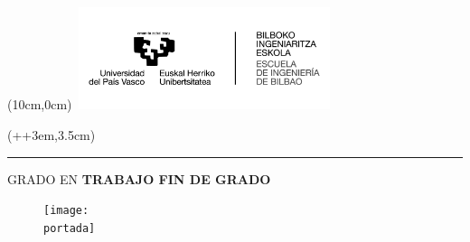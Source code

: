 
\begin{titlepage}
    \begin{textblock*}{\textwidth}(10cm,0cm)
        \includegraphics[width=7.5cm, height=3cm]{images/logos/Logo_EHU.jpg}
    \end{textblock*}
    
    
    \begin{textblock*}{\paperwidth}(\dimexpr\parindent+\oddsidemargin+3em\relax,3.5cm)
        \begin{minipage}{\dimexpr\linewidth-7.5cm\relax}
            \color{white}
            \noindent\rule{\linewidth}{0cm}
            \textsf{ {\large GRADO EN \grado}}
            \newline
            \newline \newline
            \textsf{\textbf{ {\Huge TRABAJO FIN DE GRADO }}}
        \end{minipage}
    \end{textblock*}
    
    \vspace*{3.5cm}
    \begin{minipage}{\linewidth}
        \setlength{\baselineskip}{1.7\baselineskip}
        \centering
        \textsf{ \textbf{ {\LARGE \titulo }}}
    \end{minipage}

    \vspace*{0.5cm}
    \begin{figure}[H]
        \centering
        \texttt{[image: \\portada]}
    \end{figure}


\end{titlepage}

